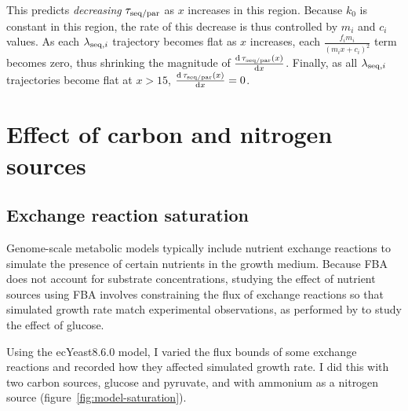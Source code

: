 This predicts \emph{decreasing} $\tau_{\mathrm{seq}/\mathrm{par}}$ as $x$ increases in this region.
Because $k_{0}$ is constant in this region, the rate of this decrease is thus controlled by $m_{i}$ and $c_{i}$ values.
As each $\lambda_{\mathrm{seq},i}$ trajectory becomes flat as $x$ increases, each $\frac{f_{i}m_{i}}{(m_{i}x+c_{i})^{2}}$ term becomes zero, thus shrinking the magnitude of $\frac{\mathrm{d} \, \tau_{\mathrm{seq}/\mathrm{par}}(x)}{\mathrm{d} x}$.
Finally, as all $\lambda_{\mathrm{seq},i}$ trajectories become flat at $x > 15$, $\frac{\mathrm{d} \, \tau_{\mathrm{seq}/\mathrm{par}}(x)}{\mathrm{d} x} = 0$.


\section{Effect of carbon and nitrogen sources}
\label{sec:model-exchange}

\subsection{Exchange reaction saturation}
\label{subsec:model-saturation}

Genome-scale metabolic models typically include nutrient exchange reactions to simulate the presence of certain nutrients in the growth medium.
Because FBA does not account for substrate concentrations, studying the effect of nutrient sources using FBA involves constraining the flux of exchange reactions so that simulated growth rate match experimental observations, as performed by \textcite{elsemmanWholecellModelingYeast2022} to study the effect of glucose.

Using the ecYeast8.6.0 model, I varied the flux bounds of some exchange reactions and recorded how they affected simulated growth rate.
I did this with two carbon sources, glucose and pyruvate, and with ammonium as a nitrogen source (figure~\ref{fig:model-saturation}).

